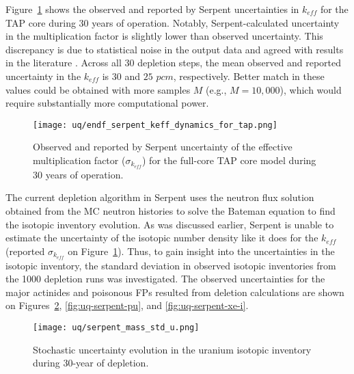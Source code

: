 Figure~\ref{fig:uq-serpent-keff-evolution} shows the observed and reported by 
Serpent uncertainties in $k_{eff}$ for the \gls{TAP} core during 30 years of 
operation. Notably, Serpent-calculated uncertainty in the multiplication 
factor is slightly lower than observed uncertainty. This discrepancy is due to 
statistical noise in the output data and agreed with results in the literature 
\cite{wyant_numerical_2012}. Across all 30 depletion steps, the mean observed 
and reported uncertainty in the $k_{eff}$ is $30$ and $25$ $pcm$, 
respectively. Better match in these values could be obtained with more samples 
$M$ (e.g., $M=10,000$), which would require substantially more computational 
power.
\begin{figure}[hbp!] %
	\centering
	\texttt{[image: uq/endf\_serpent\_keff\_dynamics\_for\_tap.png]}
	\caption{Observed and reported by Serpent uncertainty of the effective 
	multiplication factor ($\sigma_{k_{eff}}$) for the full-core \gls{TAP} 
	core model during 30 years of operation.}
	\label{fig:uq-serpent-keff-evolution}
\end{figure}

The current depletion algorithm in Serpent uses the neutron flux solution 
obtained from the \gls{MC} neutron histories to solve the Bateman equation to 
find the isotopic inventory evolution. As was discussed earlier, Serpent 
is unable to estimate the uncertainty of the isotopic number density like it 
does for the $k_{eff}$ (reported $\sigma_{k_{eff}}$ on 
Figure~\ref{fig:uq-serpent-keff-evolution}). Thus, to gain insight into the 
uncertainties in the isotopic inventory, the standard deviation in observed 
isotopic inventories from the 1000 depletion runs was investigated. The 
observed uncertainties for the major actinides and poisonous \glspl{FP} 
resulted from deletion calculations are shown on  
Figures~\ref{fig:uq-serpent-u}, \ref{fig:uq-serpent-pu}, and 
\ref{fig:uq-serpent-xe-i}.

\begin{figure}[htp!] %
	\centering
	\texttt{[image: uq/serpent\_mass\_std\_u.png]}
		\vspace{-4mm}
	\caption{Stochastic uncertainty evolution in the uranium isotopic 
	inventory during 30-year of depletion.}
	\label{fig:uq-serpent-u}
\end{figure}

